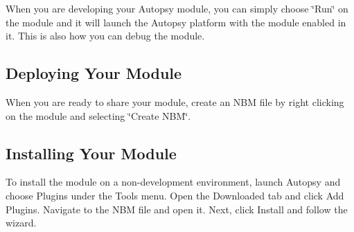 When you are developing your Autopsy module, you can simply choose \char`\"{}\+Run\char`\"{} on the module and it will launch the Autopsy platform with the module enabled in it. This is also how you can debug the module.\hypertarget{mod_dev_page_mod_dev_aut_deploy}{}\subsection{Deploying Your Module}\label{mod_dev_page_mod_dev_aut_deploy}
When you are ready to share your module, create an N\+BM file by right clicking on the module and selecting \char`\"{}\+Create N\+B\+M\char`\"{}.\hypertarget{mod_dev_page_mod_dev_aut_install}{}\subsection{Installing Your Module}\label{mod_dev_page_mod_dev_aut_install}
To install the module on a non-\/development environment, launch Autopsy and choose Plugins under the Tools menu. Open the Downloaded tab and click Add Plugins. Navigate to the N\+BM file and open it. Next, click Install and follow the wizard. 